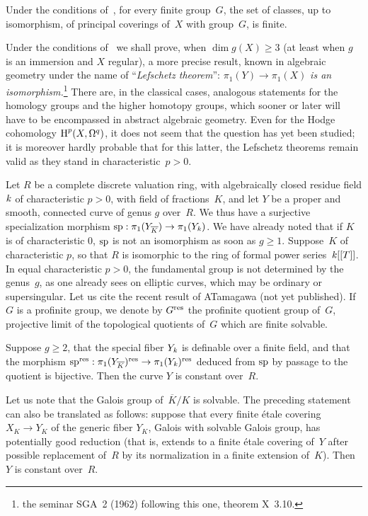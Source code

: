 \begin{corollary}
\label{X.2.12}
Under
the conditions of~, for every
finite group~$G$, the set of classes, up to isomorphism,
of principal coverings of~$X$ with group~$G$, is finite.
\end{corollary}

\begin{remark}
\label{X.2.13}
Under the conditions of~ we shall prove, when $\dim
g(X)\ge 3$ (at least when $g$ is an immersion and $X$
regular), a more precise result, known in
algebraic geometry under the name of
``\emph{Lefschetz theorem}'': $\pi_1(Y)\to \pi_1(X)$
\emph{is an isomorphism.}\footnote{\Cf the seminar SGA~2 (1962)
following this one, theorem X~3.10.}
There are, in the classical cases, analogous
statements for the homology groups and the higher
homotopy groups, which sooner or later will have to be
encompassed in abstract algebraic
geometry. Even for the Hodge cohomology $\H^p(X,\Omega^q)$,
it does not seem that the question has yet been
studied; it is moreover hardly probable that for this
latter, the Lefschetz theorems remain valid as they stand
in characteristic~$p>0$.
\end{remark}

\begin{remarkMR}
\label{X.2.14}
Let $R$ be a complete discrete valuation ring, with
algebraically closed residue field $\kres$ of characteristic $p>0$, with
field of fractions~$K$, and let $Y$ be a proper and smooth,
connected curve of genus $g$ over~$R$. We thus have a surjective
specialization morphism $\sp : \pi_1(Y_{\overline{K}}) 
\to\pi_1(Y_{\kres})$.
We have already noted that if $K$ is of characteristic 0, $\sp$ is not an
isomorphism as soon as $g\geq1$. Suppose~$K$ of characteristic $p$,
so that $R$ is isomorphic to the ring of formal
power series~$\kres[[T]]$.
In equal characteristic $p >0$, the fundamental group is not
determined by the genus~$g$, as one already sees on elliptic curves,
which may be ordinary or supersingular. Let us cite
the recent result of A\ptbl Tamagawa (not yet published). If~$G$ is a
profinite group, we denote by $G^{\res}$ the profinite quotient group of~$G$,
projective limit of the topological quotients of~$G$ which are finite
solvable.

\begin{theoremstar}
Suppose $g\geq2$, that the special fiber $Y_{\kres}$
is definable over a finite field, and that the morphism
$\sp^{\res}:\pi_1(Y_{\overline{K}})^{\res}\to\pi_1(Y_{\kres})^{\res}$ deduced from
$\sp$ by passage to the quotient is bijective. Then the curve $Y$ is
constant over~$R$.
\end{theoremstar}

Let us note that the Galois group of~$\overline{K}/K$ is solvable. The
preceding statement can also be translated as follows: suppose that
every finite \'etale covering $X_K\to Y_K$ of the generic fiber $Y_K$,
Galois with solvable Galois group, has potentially good
reduction (that is, extends to a finite \'etale covering of~$Y$
after possible replacement of~$R$ by its normalization in a
finite extension of~$K$). Then $Y$ is constant over~$R$.
\end{remarkMR}
